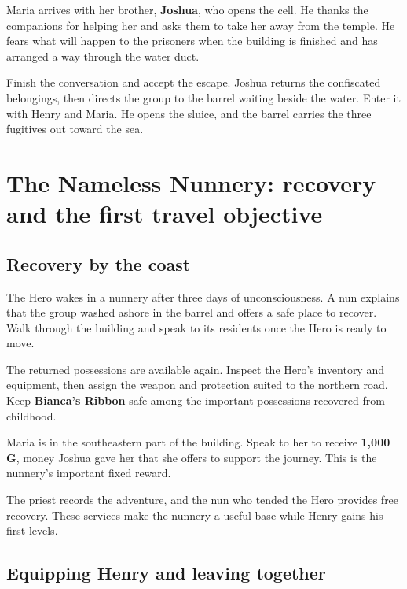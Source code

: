 Maria arrives with her brother, \textbf{Joshua}, who opens the cell.
He thanks the companions for helping her and asks them to take her
away from the temple. He fears what will happen to the prisoners when
the building is finished and has arranged a way through the water duct.

Finish the conversation and accept the escape. Joshua returns the
confiscated belongings, then directs the group to the barrel waiting
beside the water. Enter it with Henry and Maria. He opens the sluice,
and the barrel carries the three fugitives out toward the sea.


\section{The Nameless Nunnery: recovery and the first travel objective}

\subsection*{Recovery by the coast}

The Hero wakes in a nunnery after three days of unconsciousness.
A nun explains that the group washed ashore in the barrel and offers
a safe place to recover. Walk through the building and speak to its
residents once the Hero is ready to move.

The returned possessions are available again. Inspect the Hero's
inventory and equipment, then assign the weapon and protection suited
to the northern road. Keep \textbf{Bianca's Ribbon} safe among the
important possessions recovered from childhood.

Maria is in the southeastern part of the building. Speak to her to
receive \textbf{1,000 G}, money Joshua gave her that she offers to
support the journey. This is the nunnery's important fixed reward.

The priest records the adventure, and the nun who tended the Hero
provides free recovery. These services make the nunnery a useful base
while Henry gains his first levels.

\subsection*{Equipping Henry and leaving together}

